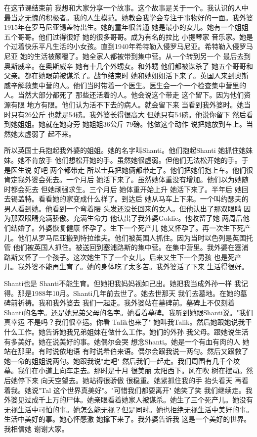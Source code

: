 在这节课结束前 我想和大家分享一个故事。这个故事是关于一个。我认识的人中最当之无愧的积极者。我的人生模范。她教会我学会专注于事物好的一面。我外婆1915年在罗马尼亚锡盖特出生。她的童年很普通 她是最小的女儿。她有一个姐姐 五个哥哥。他们过得很好 她的很多哥哥。成为有名的拉比 小提琴家 音乐家。她是个过着快乐平凡生活的小女孩。直到1940年希特勒入侵罗马尼亚。希特勒入侵罗马尼亚 她的生活被颠覆了。她全家人都被带到集中营。从一个转到另一个 最后去到奥斯威辛。在奥斯威辛 她有十几个外甥女。和外甥 他们都被谋杀了 她五个哥哥和父亲。都在她眼前被谋杀了。战争结束时 她和她姐姐活下来了。英国人来到奥斯威辛解救集中营的人。他们当时带着一个医生。医生会一个一个检查集中营里的人。当然大部分都死了 那些还活着的人。他会说这个带走 这个留下。因为他们资源有限 地方有限。他们认为活不下去的病人。就会留下来 当看到我外婆时。她当时只有26公斤 也就是54磅。我外婆长得很高大 但她只有54磅。他说你留下 然后看到她姐姐。她就在她身旁 她姐姐36公斤 79磅。他做这个动作 说把她放到车上。当然她太虚弱了 起不来。 

所以英国士兵抱起我外婆的姐姐。她的名字叫Shanti。他们抱起Shanti 她抓住她妹妹。她不肯放手 他们想松开她的手。虽然她很虚弱。但他们无法松开她的手。于是医生说 好吧 两个都带走 所以士兵把她俩都带走了。他们把她们抱上车。他们很肯定我外婆会死去。一个月后 她活下来了。虽然她体重没有增加。他们以为她随时都会死去 但她顽强求生。三个月后 她体重开始上升 她活下来了。半年后 她回去锡盖特。看看她的家变成什么样了。到达后 她从马车上下来。一个叫约瑟夫的男人看到她。他看到一个弯着腰 头发还没长回来的女人。但他认出了那双眼睛 因为那双眼睛充满骄傲。充满生命力 他认出了我外婆Goldie。他收留了她 两周后他们结婚了。外婆恢复健康 怀孕了。生下一个死产儿 她又怀孕了。再一次生下死产儿。他们从罗马尼亚搬到特拉维夫。他们被英国人抓住。因为当时以色列是英国托管 他们被英国人抓住。被送回到塞浦路斯的集中营。在集中营里。我外婆在塞浦路斯又怀了一个孩子。这次她生下了一个女儿。后来又生下一个男孩 也是死产儿。我外婆不能再生育了。她的身体吃了太多苦。我外婆活了下来 生活得很好。 

Shanti也是 Shanti不能生育。但她把我妈妈视如己出。她把我当成外孙一样 我记得。那是1988年10月。Shanti几年前去世了。她去世那天 我们去墓地。在她的墓碑前祈祷。我和我外婆去 我们一起走。我外婆站在墓碑前。墓碑上不仅刻着Shanti的名字。还是她兄弟父母的名字。她看着墓碑。我听到她跟Shanti说。"我们真幸运 不是吗？我们很幸运。你看 Talik也来了" 她叫我Talik。然后她跟她说我干什么工作。她告诉她我兄弟姐妹在做什么工作。她们的外孙 我父母。跟她说生活有多美好。她在说美好的事。她偶尔会哭 想念Shanti。她是一个有血有肉的人 她站在那里。有时说依地语 有时说希伯来语。偶尔会跟我说一两句。然后又跟救了她一命的姐姐说两句。她跟我说"走吧" 然后我们一起走。我们周围有几千个坟墓。我们在小道上向车走去。那时是十月 很美丽 太阳西下。风在吹 树在摆动。然后她停下来 向天空望去。她站得很骄傲 很稳重。她紧抓住我的手 抬头看天 再看着我。她说"Tal 这个世界真美好"。"可惜我们都要离开" 她笑了笑 我们继续走。我外婆见过成千上万的尸体。她亲眼看着她家人被谋杀。她生了三个死产儿。她没有无视生活中可怕的事。她怎么能无视？但是同时。她也拒绝无视生活中美好的事。生活中美好的事。她心怀感激 她撑下来了。我外婆告诉我 这是一个美好的世界。我相信她 谢谢大家。 


